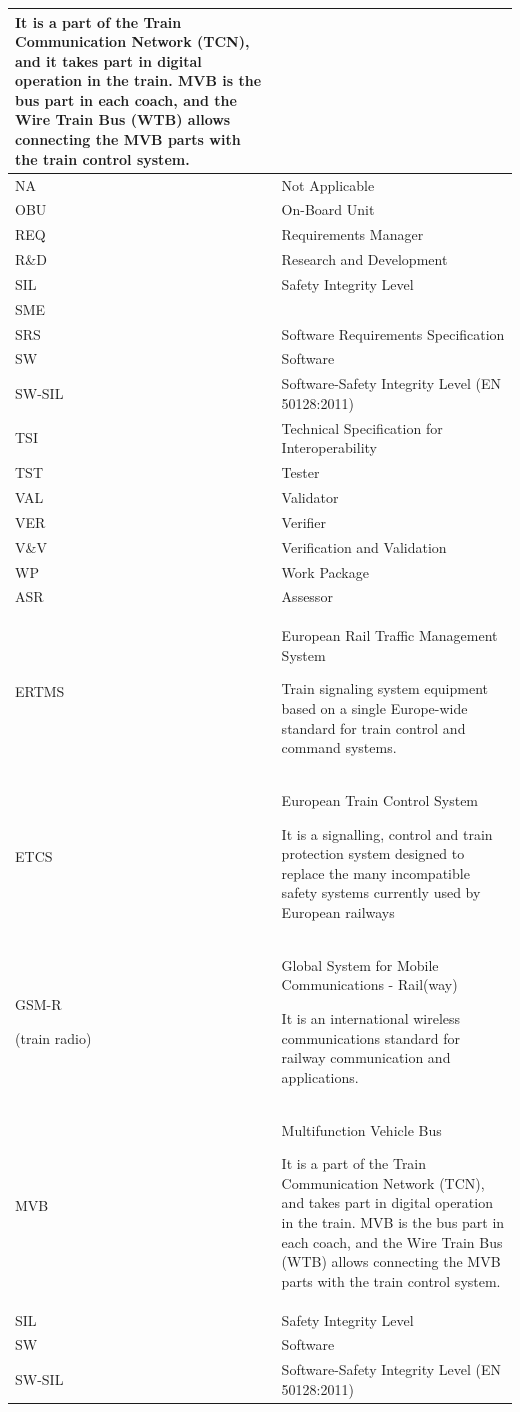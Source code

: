 \documentclass{template/openetcs_article}
\begin{document}
\begin{flushleft}
\begin{supertabular}{|m{2cm}|m{12cm}|}
It is a part of the Train Communication Network (TCN), and it takes part in digital operation in the train. MVB is the bus part in each coach, and the Wire Train Bus (WTB) allows connecting the MVB parts with the train control system.\\\hline
NA &
Not Applicable\\\hline
OBU &
On-Board Unit\\\hline
REQ &
Requirements Manager\\\hline
R\&D &
Research and Development\\\hline
SIL &
Safety Integrity Level\\\hline
SME &
~
\\\hline
SRS &
Software Requirements Specification\\\hline
SW &
Software\\\hline
SW-SIL &
Software-Safety Integrity Level (EN 50128:2011)\\\hline
TSI &
Technical Specification for Interoperability\\\hline
TST &
Tester\\\hline
VAL &
Validator\\\hline
VER &
Verifier\\\hline
V\&V &
Verification and Validation\\\hline
WP &
Work Package\\\hline
ASR &
Assessor\\\hline
ERTMS &
European Rail Traffic Management System

Train signaling system equipment based on a single Europe-wide standard for train control and command systems.\\\hline
ETCS &
European Train Control System

It is a signalling, control and train protection system designed to replace the many incompatible safety systems currently used by European railways\\\hline
GSM-R

(train radio) &
Global System for Mobile Communications - Rail(way)

It is an international wireless communications standard for railway communication and applications.\\\hline
MVB &
Multifunction Vehicle Bus

It is a part of the Train Communication Network (TCN), and takes part in digital operation in the train. MVB is the bus part in each coach, and the Wire Train Bus (WTB) allows connecting the MVB parts with the train control system.\\\hline
SIL &
Safety Integrity Level\\\hline
SW &
Software\\\hline
SW-SIL &
Software-Safety Integrity Level (EN 50128:2011)


\end{supertabular}
\end{flushleft}
\end{document}
